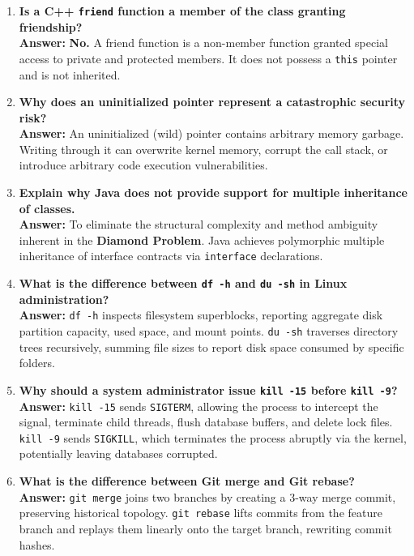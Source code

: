 \begin{enumerate}[leftmargin=*,label=\textbf{Q\arabic*.}]
    \textbf{Answer:} A pure virtual function is a virtual member function declared with \texttt{= 0} and no implementation in the base class. Any class containing at least one pure virtual function is an abstract class and cannot be instantiated.
    \item \textbf{Is a C++ \texttt{friend} function a member of the class granting friendship?} \\
    \textbf{Answer:} \textbf{No.} A friend function is a non-member function granted special access to private and protected members. It does not possess a \texttt{this} pointer and is not inherited.
    \item \textbf{Why does an uninitialized pointer represent a catastrophic security risk?} \\
    \textbf{Answer:} An uninitialized (wild) pointer contains arbitrary memory garbage. Writing through it can overwrite kernel memory, corrupt the call stack, or introduce arbitrary code execution vulnerabilities.
    \item \textbf{Explain why Java does not provide support for multiple inheritance of classes.} \\
    \textbf{Answer:} To eliminate the structural complexity and method ambiguity inherent in the \textbf{Diamond Problem}. Java achieves polymorphic multiple inheritance of interface contracts via \texttt{interface} declarations.
    \item \textbf{What is the difference between \texttt{df -h} and \texttt{du -sh} in Linux administration?} \\
    \textbf{Answer:} \texttt{df -h} inspects filesystem superblocks, reporting aggregate disk partition capacity, used space, and mount points. \texttt{du -sh} traverses directory trees recursively, summing file sizes to report disk space consumed by specific folders.
    \item \textbf{Why should a system administrator issue \texttt{kill -15} before \texttt{kill -9}?} \\
    \textbf{Answer:} \texttt{kill -15} sends \texttt{SIGTERM}, allowing the process to intercept the signal, terminate child threads, flush database buffers, and delete lock files. \texttt{kill -9} sends \texttt{SIGKILL}, which terminates the process abruptly via the kernel, potentially leaving databases corrupted.
    \item \textbf{What is the difference between Git merge and Git rebase?} \\
    \textbf{Answer:} \texttt{git merge} joins two branches by creating a 3-way merge commit, preserving historical topology. \texttt{git rebase} lifts commits from the feature branch and replays them linearly onto the target branch, rewriting commit hashes.

\end{enumerate}
